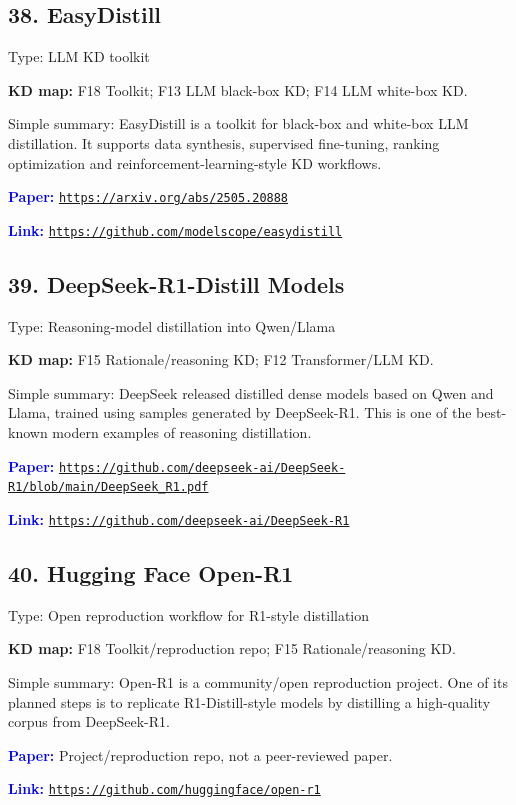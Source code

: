 \documentclass[10pt]{article}
\begin{document}
\subsection*{38. EasyDistill}
Type: LLM KD toolkit\par
\textbf{KD map:} F18 Toolkit; F13 LLM black-box KD; F14 LLM white-box KD.\par
Simple summary: EasyDistill is a toolkit for black-box and white-box LLM distillation. It supports data synthesis, supervised fine-tuning, ranking optimization and reinforcement-learning-style KD workflows.\par
\textcolor{blue}{\textbf{Paper:}} \href{https://arxiv.org/abs/2505.20888}{\nolinkurl{https://arxiv.org/abs/2505.20888}}\par
\textcolor{blue}{\textbf{Link:}} \href{https://github.com/modelscope/easydistill}{\nolinkurl{https://github.com/modelscope/easydistill}}\par

\subsection*{39. DeepSeek-R1-Distill Models}
Type: Reasoning-model distillation into Qwen/Llama\par
\textbf{KD map:} F15 Rationale/reasoning KD; F12 Transformer/LLM KD.\par
Simple summary: DeepSeek released distilled dense models based on Qwen and Llama, trained using samples generated by DeepSeek-R1. This is one of the best-known modern examples of reasoning distillation.\par
\textcolor{blue}{\textbf{Paper:}} \href{https://github.com/deepseek-ai/DeepSeek-R1/blob/main/DeepSeek_R1.pdf}{\nolinkurl{https://github.com/deepseek-ai/DeepSeek-R1/blob/main/DeepSeek_R1.pdf}}\par
\textcolor{blue}{\textbf{Link:}} \href{https://github.com/deepseek-ai/DeepSeek-R1}{\nolinkurl{https://github.com/deepseek-ai/DeepSeek-R1}}\par

\subsection*{40. Hugging Face Open-R1}
Type: Open reproduction workflow for R1-style distillation\par
\textbf{KD map:} F18 Toolkit/reproduction repo; F15 Rationale/reasoning KD.\par
Simple summary: Open-R1 is a community/open reproduction project. One of its planned steps is to replicate R1-Distill-style models by distilling a high-quality corpus from DeepSeek-R1.\par
\textcolor{blue}{\textbf{Paper:}} Project/reproduction repo, not a peer-reviewed paper.\par
\textcolor{blue}{\textbf{Link:}} \href{https://github.com/huggingface/open-r1}{\nolinkurl{https://github.com/huggingface/open-r1}}\par
\end{document}
